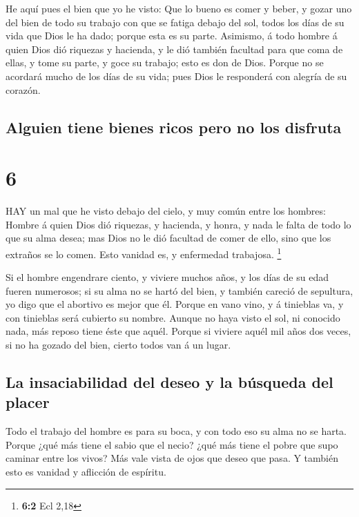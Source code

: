  He aquí pues el bien que yo he visto: Que lo bueno es
comer y beber, y gozar uno del bien de todo su trabajo con que se fatiga
debajo del sol, todos los días de su vida que Dios le ha dado; porque
esta es su parte.  Asimismo, á todo hombre á quien Dios dió
riquezas y hacienda, y le dió también facultad para que coma de ellas, y
tome su parte, y goce su trabajo; esto es don de Dios. 
Porque no se acordará mucho de los días de su vida; pues Dios le
responderá con alegría de su corazón.

\hypertarget{alguien-tiene-bienes-ricos-pero-no-los-disfruta}{%
\subsection{Alguien tiene bienes ricos pero no los
disfruta}\label{alguien-tiene-bienes-ricos-pero-no-los-disfruta}}

\hypertarget{section-5}{%
\section{6}\label{section-5}}

 HAY un mal que he visto debajo del cielo, y muy común entre
los hombres:  Hombre á quien Dios dió riquezas, y hacienda,
y honra, y nada le falta de todo lo que su alma desea; mas Dios no le
dió facultad de comer de ello, sino que los extraños se lo comen. Esto
vanidad es, y enfermedad trabajosa. \footnote{\textbf{6:2} Ecl 2,18}

 Si el hombre engendrare ciento, y viviere muchos años, y
los días de su edad fueren numerosos; si su alma no se hartó del bien, y
también careció de sepultura, yo digo que el abortivo es mejor que él.
 Porque en vano vino, y á tinieblas va, y con tinieblas será
cubierto su nombre.  Aunque no haya visto el sol, ni
conocido nada, más reposo tiene éste que aquél.  Porque si
viviere aquél mil años dos veces, si no ha gozado del bien, cierto todos
van á un lugar.

\hypertarget{la-insaciabilidad-del-deseo-y-la-buxfasqueda-del-placer}{%
\subsection{La insaciabilidad del deseo y la búsqueda del
placer}\label{la-insaciabilidad-del-deseo-y-la-buxfasqueda-del-placer}}

 Todo el trabajo del hombre es para su boca, y con todo eso
su alma no se harta.  Porque ¿qué más tiene el sabio que el
necio? ¿qué más tiene el pobre que supo caminar entre los vivos?
 Más vale vista de ojos que deseo que pasa. Y también esto
es vanidad y aflicción de espíritu.

